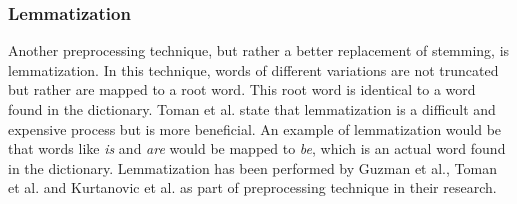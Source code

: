 \documentclass[a4paper,12pt,twoside]{report}
\begin{document}
\subsubsection{Lemmatization}
Another preprocessing technique, but rather a better replacement of stemming, is lemmatization. In this technique, words of different variations are not truncated but rather are mapped to a root word. This root word is identical to a word found in the dictionary. Toman et al.\cite{Toman2006} state that lemmatization is a difficult and expensive process but is more beneficial. An example of lemmatization would be that words like \textit{is} and \textit{are} would be mapped to \textit{be}, which is an actual word found in the dictionary. Lemmatization has been performed by Guzman et al.\cite{Guzman2014}, Toman et al. \cite{Toman2006} and Kurtanovic et al.\cite{Kurtanovic2017} as part of preprocessing technique in their research. 
\end{document}
